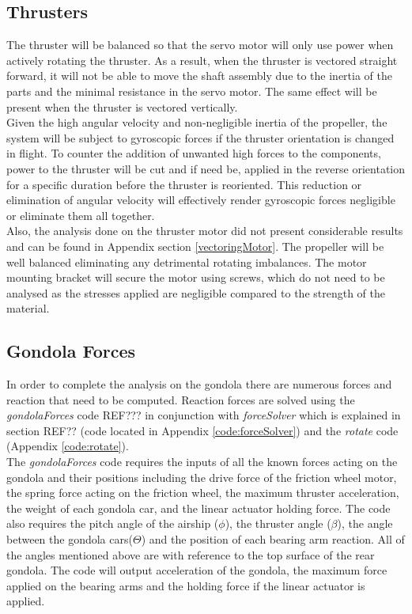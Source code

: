 \documentclass[../main.tex]{subfiles}
\begin{document}
\subsection{Thrusters} \label{thrusterIntro}
The thruster will be balanced so that the servo motor will only use power when actively rotating the thruster. As a result, when the thruster is vectored straight forward, it will not be able to move the shaft assembly due to the inertia of the parts and the minimal resistance in the servo motor. The same effect will be present when the thruster is vectored vertically.\\

Given the high angular velocity and non-negligible inertia of the propeller, the system will be subject to gyroscopic forces if the thruster orientation is changed in flight. To counter the addition of unwanted high forces to the components, power to the thruster will be cut and if need be, applied in the reverse orientation for a specific duration before the thruster is reoriented. This reduction or elimination of angular velocity will effectively render gyroscopic forces negligible or eliminate them all together. \\

Also, the analysis done on the thruster motor did not present considerable results and can be found in Appendix section \ref{vectoringMotor}. The propeller will be well balanced eliminating any detrimental rotating imbalances. The motor mounting bracket will secure the motor using screws, which do not need to be analysed as the stresses applied are negligible compared to the strength of the material.

\subsection{Gondola Forces} \label{gondForces}
In order to complete the analysis on the gondola there are numerous forces and reaction that need to be computed. Reaction forces are solved using the \textit{gondolaForces} code REF??? in conjunction with \textit{forceSolver} which is explained in section REF?? (code located in Appendix \ref{code:forceSolver}) and  the \textit{rotate} code (Appendix \ref{code:rotate}).\\

The \textit{gondolaForces} code requires the inputs of all the known forces acting on the gondola and their positions including the drive force of the friction wheel motor, the spring force acting on the friction wheel, the maximum thruster acceleration, the weight of each gondola car, and the linear actuator holding force. The code also requires the pitch angle of the airship ($\phi$), the thruster angle ($\beta$), the angle between the gondola cars($\Theta$) and the position of each bearing arm reaction. All of the angles mentioned above are with reference to the top surface of the rear gondola. The code will output acceleration of the gondola, the maximum force applied on the bearing arms and the holding force if the linear actuator is applied. \\
\end{document}
